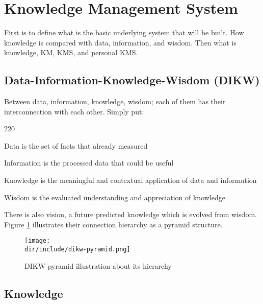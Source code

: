 \section{Knowledge Management System}
\label{sec:kms}

First is to define what is the basic underlying system that will be built.
How knowledge is compared with data, information, and wisdom.
Then what is knowledge, \ac{KM}, \ac{KMS}, and personal \ac{KMS}.

\subsection{Data-Information-Knowledge-Wisdom (DIKW)}

Between data, information, knowledge, wisdom; each of them has their interconnection with each other. Simply put:

\begin{dinglist}{220}
\item Data is the set of facts that already measured
\item Information is the processed data that could be useful %
\item Knowledge is the meaningful and contextual application of data and information %
\item Wisdom is the evaluated understanding and appreciation of knowledge %
\end{dinglist}

There is also vision, a future predicted knowledge which is evolved from wisdom.
Figure \ref{fig:kms:dikw-pyramid} illustrates their connection hierarchy as a pyramid structure.

\begin{figure}[htbp]
    \centering
    \texttt{[image: \\dir/include/dikw-pyramid.png]}
    \caption[DIKW Pyramid]{DIKW pyramid illustration about its hierarchy}
    \label{fig:kms:dikw-pyramid}
\end{figure}

\subsection{Knowledge}

